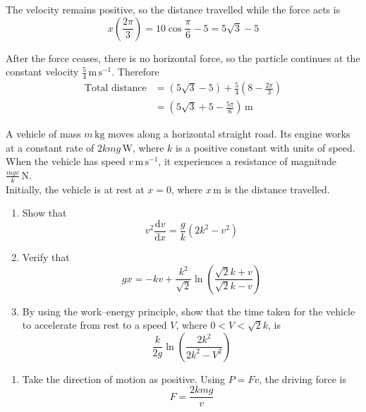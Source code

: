 \documentclass[leqno]{article}
\begin{document}
\begin{enumerate}[
  label=\textbf{\arabic*.},
  leftmargin=*,
  topsep=0pt,
  partopsep=0pt,
  parsep=0pt
]
\begin{djsSolution}
\begin{enumerate}[label=\textbf{(\alph*)}, start=1]
  The velocity remains positive, so the distance travelled while the force acts is
  \[
  x\left(\frac{2\pi}{3}\right)=10\cos\frac{\pi}{6}-5=5\sqrt3-5
  \]

  After the force ceases, there is no horizontal force, so the particle continues at the constant velocity \(\frac54\,\mathrm{m\,s^{-1}}\). Therefore
  \begin{align*}
  \text{Total distance}&=(5\sqrt3-5)+\frac54\left(8-\frac{2\pi}{3}\right)\\
  &=\left(5\sqrt3+5-\frac{5\pi}{6}\right)\,\mathrm{m}
  \end{align*}
\end{enumerate}
\end{djsSolution}

\newpage

\questionitem

A vehicle of mass $m\,\mathrm{kg}$ moves along a horizontal straight road. Its engine works at a constant rate of $2kmg\,\mathrm{W}$, where $k$ is a positive constant with units of speed. When the vehicle has speed $v\,\mathrm{m\,s^{-1}}$, it experiences a resistance of magnitude $\frac{mgv}{k}\,\mathrm{N}$. \\

Initially, the vehicle is at rest at $x=0$, where $x\,\mathrm{m}$ is the distance travelled. \\

\begin{enumerate}[label=\textbf{(\alph*)}]
  \item Show that
  \[
  v^2\dfrac{\mathrm{d}v}{\mathrm{d}x}=\dfrac{g}{k}\left(2k^2-v^2\right)
  \]
  \item Verify that
  \[
  gx=-kv+\dfrac{k^2}{\sqrt{2}}\ln\left(\dfrac{\sqrt{2}k+v}{\sqrt{2}k-v}\right)
  \]
  \item By using the work--energy principle, show that the time taken for the vehicle to accelerate from rest to a speed $V$, where $0<V<\sqrt{2}k$, is
  \[
  \dfrac{k}{2g}\ln\left(\dfrac{2k^2}{2k^2-V^2}\right)
  \]
\end{enumerate}

\vspace*{10pt}

\begin{djsSolution}
\begin{enumerate}[label=\textbf{(\alph*)}, start=1]
\item Take the direction of motion as positive. Using \(P=Fv\), the driving force is
\[
F=\frac{2kmg}{v}
\]


\end{enumerate}
\end{djsSolution}
\end{enumerate}
\end{document}
